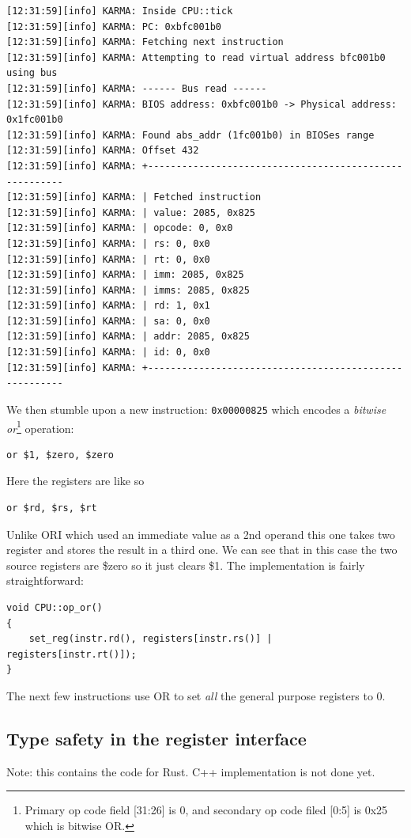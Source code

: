 \documentclass[a4paper]{article}
\newcommand{\code}[1] {\texttt{#1}}
\begin{document}
\begin{verbatim}
[12:31:59][info] KARMA: Inside CPU::tick
[12:31:59][info] KARMA: PC: 0xbfc001b0
[12:31:59][info] KARMA: Fetching next instruction
[12:31:59][info] KARMA: Attempting to read virtual address bfc001b0 using bus
[12:31:59][info] KARMA: ------ Bus read ------
[12:31:59][info] KARMA: BIOS address: 0xbfc001b0 -> Physical address: 0x1fc001b0
[12:31:59][info] KARMA: Found abs_addr (1fc001b0) in BIOSes range
[12:31:59][info] KARMA: Offset 432
[12:31:59][info] KARMA: +-------------------------------------------------------
[12:31:59][info] KARMA: | Fetched instruction 
[12:31:59][info] KARMA: | value: 2085, 0x825
[12:31:59][info] KARMA: | opcode: 0, 0x0
[12:31:59][info] KARMA: | rs: 0, 0x0
[12:31:59][info] KARMA: | rt: 0, 0x0
[12:31:59][info] KARMA: | imm: 2085, 0x825
[12:31:59][info] KARMA: | imms: 2085, 0x825
[12:31:59][info] KARMA: | rd: 1, 0x1
[12:31:59][info] KARMA: | sa: 0, 0x0
[12:31:59][info] KARMA: | addr: 2085, 0x825
[12:31:59][info] KARMA: | id: 0, 0x0
[12:31:59][info] KARMA: +-------------------------------------------------------
\end{verbatim}


We then stumble upon a new instruction: \code{0x00000825}
which encodes a \emph{bitwise or}\footnote{Primary op code
  field [31:26] is 0, and secondary op code filed [0:5] is
0x25 which is bitwise OR.} operation:

\begin{lstlisting}[language=assembly]
or $1, $zero, $zero
\end{lstlisting}

Here the registers are like so

\begin{lstlisting}[language=assembly]
or $rd, $rs, $rt
\end{lstlisting}

Unlike ORI which used an immediate value as a 2nd operand this one
takes two register and stores the result in a third one. We can see
that in this case the two source registers are \$zero so it just
clears \$1. The implementation is fairly straightforward:

\begin{lstlisting}
void CPU::op_or()
{
	set_reg(instr.rd(), registers[instr.rs()] | registers[instr.rt()]);
}
\end{lstlisting}

The next few instructions use OR to set \emph{all} the general purpose
registers to 0.

\subsection{Type safety in the register interface}
Note: this contains the code for Rust.  C++ implementation is not done yet.
\end{document}
